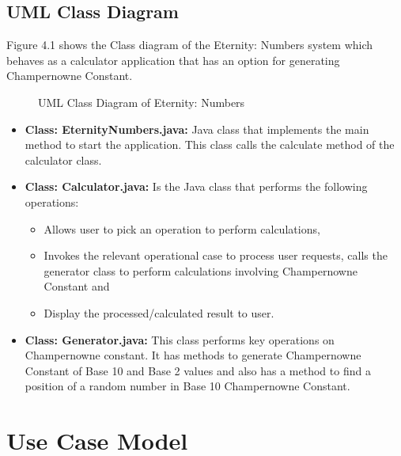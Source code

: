 \documentclass[12pt, a4paper]{report}
\begin{document}
\section{UML Class Diagram}
Figure 4.1 shows the Class diagram of the Eternity: Numbers system which behaves as a calculator application that has an option for generating Champernowne Constant.
\begin{figure}[h]
    \centering
    \caption{UML Class Diagram of Eternity: Numbers}
    \label{fig:UML Class Diagram of Eternity: Numbers}
\end{figure}

\begin{itemize}
    \item \textbf{Class: EternityNumbers.java:} Java class that implements the main method to start the application. This class calls the calculate method of the calculator class.
    \item \textbf{Class: Calculator.java:} Is the Java class that performs the following operations:
    \begin{itemize}
        \item Allows user to pick an operation to perform calculations,
        \item Invokes the relevant operational case to process user requests, calls the generator class to perform calculations involving Champernowne Constant and
        \item Display the processed/calculated result to user.
    \end{itemize}
    \item \textbf{Class: Generator.java:} This class performs key operations on Champernowne constant. It has methods to generate Champernowne Constant of Base 10 and Base 2 values and also has a method to find a position of a random number in Base 10 Champernowne Constant.
\end{itemize}

\chapter{Use Case Model}
\end{document}
